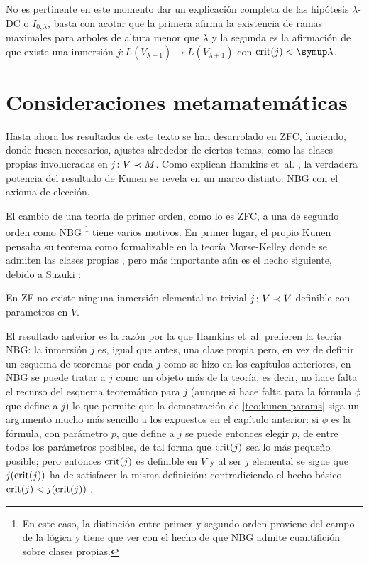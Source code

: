 No es pertinente en este momento dar un explicación completa de las hipótesis
$\lambda$-DC o $I_{0,\lambda}$, basta con acotar que la primera afirma la existencia
de ramas maximales para arboles de altura menor que $\lambda$ y la segunda es la afirmación
de que existe una inmersión $j\colon L(V_{\lambda+1})\to L(V_{\lambda+1})$
con $\crit{j}<\lambda$.

\section{Consideraciones metamatemáticas}

Hasta ahora los resultados de este texto se han desarrolado en ZFC,
haciendo, donde fuesen necesarios, ajustes alrededor de ciertos
temas, como las clases propias involucradas en $j\colon V\prec M$.
Como explican Hamkins et~al. \autocite{hamkins_generalizations_2012},
la verdadera potencia del resultado de Kunen se revela
en un marco distinto: NBG con el axioma de elección.

El cambio de una teoría de primer orden, como lo es ZFC, a una de segundo
orden como NBG%
\footnote{En este caso, la distinción entre primer y segundo orden
proviene del campo de la lógica y tiene que ver con el hecho de que NBG
admite cuantifición sobre clases propias.}
tiene varios motivos. En primer lugar, el propio Kunen pensaba su teorema como formalizable
en la teoría Morse-Kelley donde se admiten las clases propias \autocite[407]{kunen_elementary_1971},
pero más importante aún es el hecho siguiente, debido a Suzuki \autocite{suzuki_no_1999}:

\begin{teo}\label{teo:kunen-params}
    En ZF no existe ninguna inmersión elemental no trivial
    $j\colon V\prec V$ definible con parametros en $V$.
\end{teo}

El resultado anterior es la razón por la que Hamkins et~al. prefieren la teoría NBG:
la inmersión $j$ es, igual que antes, una clase propia pero, en vez de definir
un esquema de teoremas por cada $j$ como se hizo en los capítulos anteriores, en NBG
se puede tratar a $j$ como un objeto más de la teoría, es decir,
no hace falta el recurso del esquema teoremático para $j$ (aunque si hace falta
para la fórmula $\phi$ que define a $j$) lo que permite que la demostración de \ref{teo:kunen-params}
siga un argumento mucho más sencillo a los expuestos en el capítulo anterior:
si $\phi$ es la fórmula, con parámetro $p$, que define a $j$ se puede entonces elegir
$p$, de entre todos los parámetros posibles, de tal forma que $\operatorname{crit} (j)$ sea lo más
pequeño posible; pero entonces $\operatorname{crit} (j)$ es definible en $V$ y al ser $j$ elemental
se sigue que $j(\operatorname{crit} (j))$ ha de satisfacer la misma definición: contradiciendo el hecho
básico $\operatorname{crit} (j) < j(\operatorname{crit} (j))$ \autocite[Teorema 32]{hamkins_generalizations_2012}.

